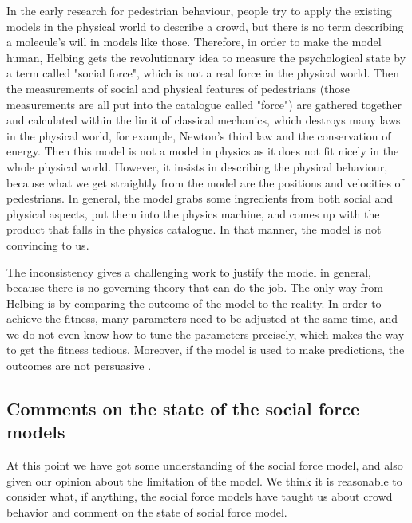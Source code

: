 In the early research for pedestrian behaviour, people try to apply the existing 
models in the physical world to describe a crowd, but there is no term describing 
a molecule's will in models like those. Therefore, in order to make the model 
human, Helbing gets the revolutionary idea to measure the psychological state 
by a term called "social force", which is not a real force in the physical world. 
\cite{social-force} Then the measurements of social and physical features 
of pedestrians (those measurements are all put into the catalogue called "force") 
are gathered together and calculated within the limit of classical mechanics, 
which destroys many laws in the physical world, for example, Newton's third law 
and the conservation of energy. Then this model is not a model in physics as 
it does not fit nicely in the whole physical world. However, it insists in describing 
the physical behaviour, because what we get straightly from the model are 
the positions and velocities of pedestrians. In general, the model grabs some 
ingredients from both social and physical aspects, put them into the physics 
machine, and comes up with the product that falls in the physics catalogue. 
In that manner, the model is not convincing to us.

The inconsistency gives a challenging work to justify the model in general, 
because there is no governing theory that can do the job. The only way from Helbing 
is by comparing the outcome of the model to the reality. In order to achieve the 
fitness, many parameters need to be adjusted at the same time, and we do not 
even know how to tune the parameters precisely, which makes the way to 
get the fitness tedious. Moreover, if the model is used to make predictions, the
outcomes are not persuasive . 

\subsection{Comments on the state of the social force models}
At this point we have got some understanding of the social force model, and 
also given our opinion about the limitation of the model. We think it is 
reasonable to consider what, if anything, the social force models have taught 
us about crowd behavior and comment on the state of social force model. 

